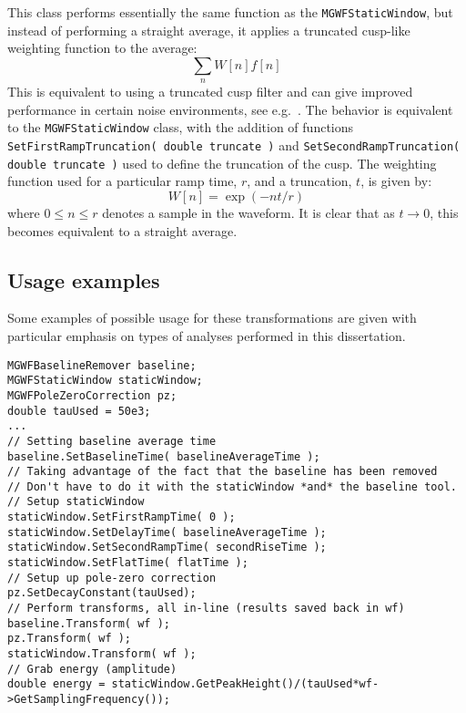 This class performs essentially the same function as the \lstinline!MGWFStaticWindow!, but instead of performing a straight average, it applies a truncated cusp-like weighting function to the average:  
				\[
					\sum_{n} W[n] f[n]
				\]
This is equivalent to using a truncated cusp filter and can give improved performance in certain noise environments, see e.g.~\cite{Gatti1990467}.  The behavior is equivalent to the \lstinline!MGWFStaticWindow! class, with the addition of functions \lstinline!SetFirstRampTruncation( double truncate )! and \lstinline!SetSecondRampTruncation( double truncate )! used to define the truncation of the cusp.  The weighting function used for a particular ramp time, $r$, and a truncation, $t$, is given by:
				\[
				W[n] = \exp (-n t/r)
				\]
where $0\leq n \leq r$ denotes a sample in the waveform.  It is clear that as $t \to 0$, this becomes equivalent to a straight average.
	
		\subsection{Usage examples}
	Some examples of possible usage for these transformations are given with particular emphasis on types of analyses performed in this dissertation.  
			\begin{lstlisting}[caption=Calculating amplitude of pulse in {C$++$}]
MGWFBaselineRemover baseline;
MGWFStaticWindow staticWindow;
MGWFPoleZeroCorrection pz;
double tauUsed = 50e3;
... 
// Setting baseline average time
baseline.SetBaselineTime( baselineAverageTime );
// Taking advantage of the fact that the baseline has been removed
// Don't have to do it with the staticWindow *and* the baseline tool.
// Setup staticWindow
staticWindow.SetFirstRampTime( 0 );
staticWindow.SetDelayTime( baselineAverageTime );
staticWindow.SetSecondRampTime( secondRiseTime );
staticWindow.SetFlatTime( flatTime );
// Setup up pole-zero correction
pz.SetDecayConstant(tauUsed);
// Perform transforms, all in-line (results saved back in wf)
baseline.Transform( wf );
pz.Transform( wf );
staticWindow.Transform( wf );
// Grab energy (amplitude)
double energy = staticWindow.GetPeakHeight()/(tauUsed*wf->GetSamplingFrequency());
			\end{lstlisting}	

